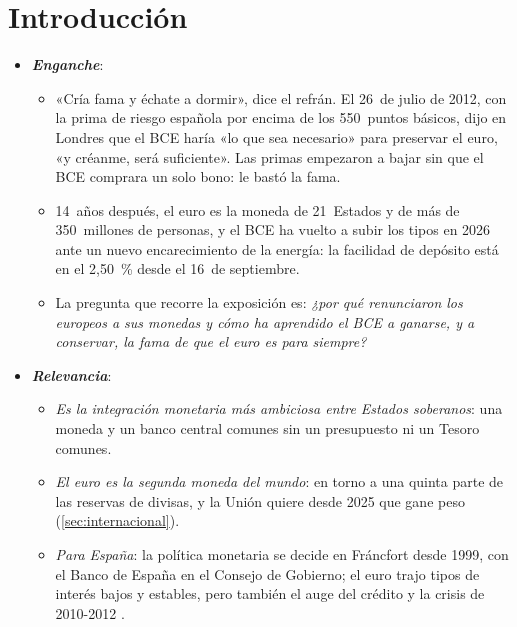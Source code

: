 \documentclass[11pt]{article}
\begin{document}
\tceetitulo

\section*{Introducción}

\begin{itemize}
\item \textbf{\emph{Enganche}}:
  \begin{itemize}
  \item «Cría fama y échate a dormir», dice el refrán. El 26~de julio de 2012, con la prima de riesgo española por encima de los 550~puntos básicos,  dijo en Londres que el BCE haría «lo que sea necesario» para preservar el euro, «y créanme, será suficiente»\nocite{Draghi2012Speech}. Las primas empezaron a bajar sin que el BCE comprara un solo bono: le bastó la fama.
  \item 14~años después, el euro es la moneda de 21~Estados y de más de 350~millones de personas, y el BCE ha vuelto a subir los tipos en 2026 ante un nuevo encarecimiento de la energía: la facilidad de depósito está en el 2,50~\% desde el 16~de septiembre\nocite{BCE2026TiposOficiales}.
  \item La pregunta que recorre la exposición es: \emph{¿por qué renunciaron los europeos a sus monedas y cómo ha aprendido el BCE a ganarse, y a conservar, la fama de que el euro es para siempre?}
  \end{itemize}

\item \textbf{\emph{Relevancia}}:
  \begin{itemize}
  \item \emph{Es la integración monetaria más ambiciosa entre Estados soberanos}: una moneda y un banco central comunes sin un presupuesto ni un Tesoro comunes.
  \item \emph{El euro es la segunda moneda del mundo}: en torno a una quinta parte de las reservas de divisas, y la Unión quiere desde 2025 que gane peso (\ref{sec:internacional}).
  \item \emph{Para España}: la política monetaria se decide en Fráncfort desde 1999, con el Banco de España en el Consejo de Gobierno\nocite{BCE2026ConsejoGobierno}; el euro trajo tipos de interés bajos y estables, pero también el auge del crédito y la crisis de 2010-2012  .
  \end{itemize}


\end{itemize}
\end{document}

